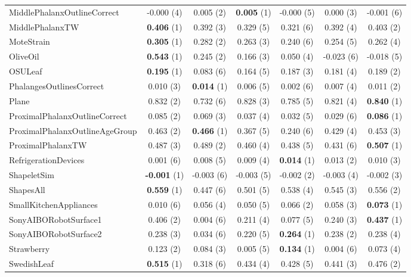 \begin{table}[ht]
\begin{adjustbox}{width=\textwidth}
\begin{tabular}{lcccccc}
    MiddlePhalanxOutlineCorrect & -0.000 (4) & 0.005 (2) & \textbf{0.005} (1) & -0.000 (5) & 0.000 (3) & -0.001 (6) \\
    MiddlePhalanxTW & \textbf{0.406} (1) & 0.392 (3) & 0.329 (5) & 0.321 (6) & 0.392 (4) & 0.403 (2) \\
    MoteStrain & \textbf{0.305} (1) & 0.282 (2) & 0.263 (3) & 0.240 (6) & 0.254 (5) & 0.262 (4) \\
    OliveOil & \textbf{0.543} (1) & 0.245 (2) & 0.166 (3) & 0.050 (4) & -0.023 (6) & -0.018 (5) \\
    OSULeaf & \textbf{0.195} (1) & 0.083 (6) & 0.164 (5) & 0.187 (3) & 0.181 (4) & 0.189 (2) \\
    PhalangesOutlinesCorrect & 0.010 (3) & \textbf{0.014} (1) & 0.006 (5) & 0.002 (6) & 0.007 (4) & 0.011 (2) \\
    Plane & 0.832 (2) & 0.732 (6) & 0.828 (3) & 0.785 (5) & 0.821 (4) & \textbf{0.840} (1) \\
    ProximalPhalanxOutlineCorrect & 0.085 (2) & 0.069 (3) & 0.037 (4) & 0.032 (5) & 0.029 (6) & \textbf{0.086} (1) \\
    ProximalPhalanxOutlineAgeGroup & 0.463 (2) & \textbf{0.466} (1) & 0.367 (5) & 0.240 (6) & 0.429 (4) & 0.453 (3) \\
    ProximalPhalanxTW & 0.487 (3) & 0.489 (2) & 0.460 (4) & 0.438 (5) & 0.431 (6) & \textbf{0.507} (1) \\
    RefrigerationDevices & 0.001 (6) & 0.008 (5) & 0.009 (4) & \textbf{0.014} (1) & 0.013 (2) & 0.010 (3) \\
    ShapeletSim & \textbf{-0.001} (1) & -0.003 (6) & -0.003 (5) & -0.002 (2) & -0.003 (4) & -0.002 (3) \\
    ShapesAll & \textbf{0.559} (1) & 0.447 (6) & 0.501 (5) & 0.538 (4) & 0.545 (3) & 0.556 (2) \\
    SmallKitchenAppliances & 0.010 (6) & 0.056 (4) & 0.050 (5) & 0.066 (2) & 0.058 (3) & \textbf{0.073} (1) \\
    SonyAIBORobotSurface1 & 0.406 (2) & 0.004 (6) & 0.211 (4) & 0.077 (5) & 0.240 (3) & \textbf{0.437} (1) \\
    SonyAIBORobotSurface2 & 0.238 (3) & 0.034 (6) & 0.220 (5) & \textbf{0.264} (1) & 0.238 (2) & 0.238 (4) \\
    Strawberry & 0.123 (2) & 0.084 (3) & 0.005 (5) & \textbf{0.134} (1) & 0.004 (6) & 0.073 (4) \\
    SwedishLeaf & \textbf{0.515} (1) & 0.318 (6) & 0.434 (4) & 0.428 (5) & 0.441 (3) & 0.476 (2) \\

\end{tabular}
\end{adjustbox}
\end{table}
